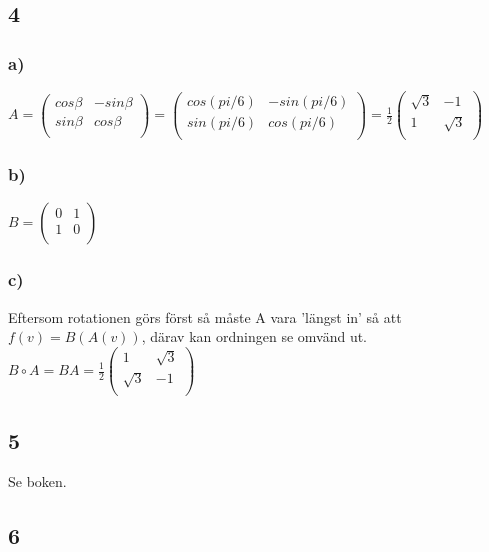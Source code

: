 \documentclass{article}
\begin{document}
\subsection*{4}
\subsubsection*{a)}
$
A = 
\begin{pmatrix}
 cos \beta & -sin \beta   \\
 sin \beta & cos \beta    \\
\end{pmatrix}
=
\begin{pmatrix}
 cos (pi/6) & -sin (pi/6)   \\
 sin (pi/6) & cos (pi/6)    \\
\end{pmatrix}
=
\frac{1}{2}
\begin{pmatrix}
 \sqrt{3} & -1   \\
 1 & \sqrt{3}    \\
\end{pmatrix}
$

\subsubsection*{b)}
$
B =
\begin{pmatrix}
 0 & 1  \\
 1 & 0    \\
\end{pmatrix}
$
\subsubsection*{c)}
Eftersom rotationen görs först så måste A vara 'längst in' så att $f(v) = B(A(v))$, därav kan ordningen se omvänd ut. \\
$B \circ A = BA = 
\frac{1}{2}
\begin{pmatrix}
 1 & \sqrt{3}  \\
 \sqrt{3} & -1    \\
\end{pmatrix}$


\subsection*{5}
Se boken.

\subsection*{6}
\end{document}
